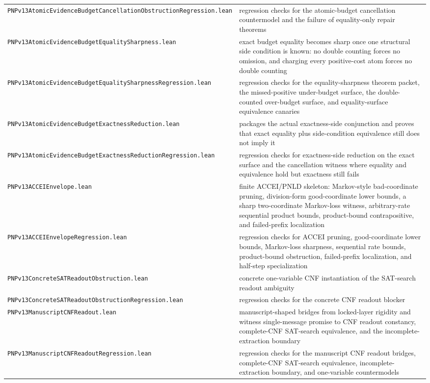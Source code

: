 \documentclass[11pt]{article}
\theoremstyle{remark}
\begin{document}
\begin{center}
\begin{tabular}{ll}
\texttt{PNPv13AtomicEvidenceBudgetCancellationObstructionRegression.lean} & regression checks for the atomic-budget cancellation countermodel and the failure of equality-only repair theorems \\
\texttt{PNPv13AtomicEvidenceBudgetEqualitySharpness.lean} & exact budget equality becomes sharp once one structural side condition is known: no double counting forces no omission, and charging every positive-cost atom forces no double counting \\
\texttt{PNPv13AtomicEvidenceBudgetEqualitySharpnessRegression.lean} & regression checks for the equality-sharpness theorem packet, the missed-positive under-budget surface, the double-counted over-budget surface, and equality-surface equivalence canaries \\
\texttt{PNPv13AtomicEvidenceBudgetExactnessReduction.lean} & packages the actual exactness-side conjunction and proves that exact equality plus side-condition equivalence still does not imply it \\
\texttt{PNPv13AtomicEvidenceBudgetExactnessReductionRegression.lean} & regression checks for exactness-side reduction on the exact surface and the cancellation witness where equality and equivalence hold but exactness still fails \\
\texttt{PNPv13ACCEIEnvelope.lean} & finite ACCEI/PNLD skeleton: Markov-style bad-coordinate pruning, division-form good-coordinate lower bounds, a sharp two-coordinate Markov-loss witness, arbitrary-rate sequential product bounds, product-bound contrapositive, and failed-prefix localization \\
\texttt{PNPv13ACCEIEnvelopeRegression.lean} & regression checks for ACCEI pruning, good-coordinate lower bounds, Markov-loss sharpness, sequential rate bounds, product-bound obstruction, failed-prefix localization, and half-step specialization \\
\texttt{PNPv13ConcreteSATReadoutObstruction.lean} & concrete one-variable CNF instantiation of the SAT-search readout ambiguity \\
\texttt{PNPv13ConcreteSATReadoutObstructionRegression.lean} & regression checks for the concrete CNF readout blocker \\
\texttt{PNPv13ManuscriptCNFReadout.lean} & manuscript-shaped bridges from locked-layer rigidity and witness single-message promise to CNF readout constancy, complete-CNF SAT-search equivalence, and the incomplete-extraction boundary \\
\texttt{PNPv13ManuscriptCNFReadoutRegression.lean} & regression checks for the manuscript CNF readout bridges, complete-CNF SAT-search equivalence, incomplete-extraction boundary, and one-variable countermodels \\

\end{tabular}
\end{center}
\end{document}
